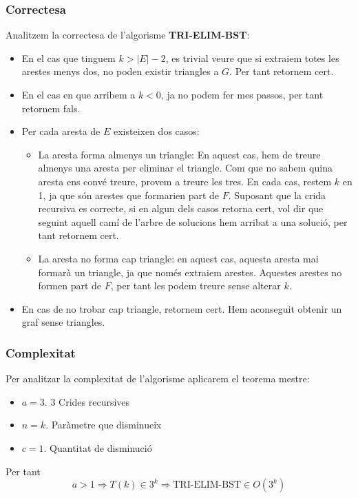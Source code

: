 \subsubsection{Correctesa}
Analitzem la correctesa de l'algorisme \textbf{TRI-ELIM-BST}:
\begin{itemize}
    \item En el cas que tinguem $k > |E|-2$, es trivial veure que si extraiem totes les arestes menys dos, no poden existir triangles a $G$. Per tant retornem cert.
    \item En el cas en que arribem a $k < 0$, ja no podem fer mes passos, per tant retornem fals.
    \item Per cada aresta de $E$ existeixen dos casos:
     \begin{itemize}
            \item La aresta forma almenys un triangle: En aquest cas, hem de treure almenys una aresta per eliminar el triangle. Com que no sabem quina aresta ens convé treure, provem a treure les tres. En cada cas, restem $k$ en 1, ja que són arestes que formarien part de $F$. Suposant que la crida recursiva es correcte, si en algun dels casos retorna cert, vol dir que seguint aquell camí de l'arbre de solucions hem arribat a una solució, per tant retornem cert.
            \item La aresta no forma cap triangle: en aquest cas, aquesta aresta mai formarà un triangle, ja que només extraiem arestes. Aquestes arestes no formen part de $F$, per tant les podem treure sense alterar $k$.
        \end{itemize}
    \item En cas de no trobar cap triangle, retornem cert. Hem aconseguit obtenir un graf sense triangles.
\end{itemize}
\newpage
\subsubsection{Complexitat}
Per analitzar la complexitat de l'algorisme aplicarem el teorema mestre:
\begin{itemize}
    \item $a = 3$. 3 Crides recursives
    \item $n = k$. Paràmetre que disminueix
    \item $c = 1$. Quantitat de disminució
\end{itemize}
Per tant
\[
a > 1 \Rightarrow T(k) \in 3^k \Rightarrow \text{TRI-ELIM-BST} \in O(3^k)
\]
